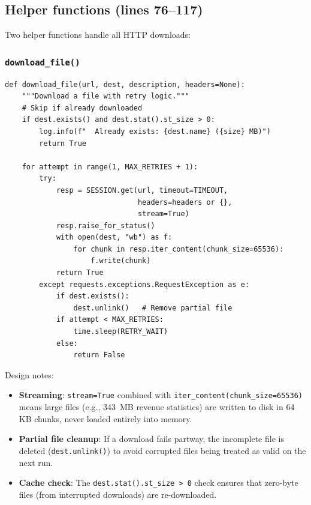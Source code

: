 \documentclass[12pt,a4paper]{article}
\begin{document}
\subsection{Helper functions (lines 76--117)}

Two helper functions handle all HTTP downloads:

\subsubsection{\texttt{download\_file()}}

\begin{lstlisting}[caption={\texttt{download\_file()} function},firstnumber=76]
def download_file(url, dest, description, headers=None):
    """Download a file with retry logic."""
    # Skip if already downloaded
    if dest.exists() and dest.stat().st_size > 0:
        log.info(f"  Already exists: {dest.name} ({size} MB)")
        return True

    for attempt in range(1, MAX_RETRIES + 1):
        try:
            resp = SESSION.get(url, timeout=TIMEOUT,
                               headers=headers or {},
                               stream=True)
            resp.raise_for_status()
            with open(dest, "wb") as f:
                for chunk in resp.iter_content(chunk_size=65536):
                    f.write(chunk)
            return True
        except requests.exceptions.RequestException as e:
            if dest.exists():
                dest.unlink()   # Remove partial file
            if attempt < MAX_RETRIES:
                time.sleep(RETRY_WAIT)
            else:
                return False
\end{lstlisting}

Design notes:
\begin{itemize}
    \item \textbf{Streaming}: \texttt{stream=True} combined with \texttt{iter\_content(chunk\_size=65536)} means large files (e.g., 343~MB revenue statistics) are written to disk in 64\,KB chunks, never loaded entirely into memory.
    \item \textbf{Partial file cleanup}: If a download fails partway, the incomplete file is deleted (\texttt{dest.unlink()}) to avoid corrupted files being treated as valid on the next run.
    \item \textbf{Cache check}: The \texttt{dest.stat().st\_size > 0} check ensures that zero-byte files (from interrupted downloads) are re-downloaded.
\end{itemize}
\end{document}
